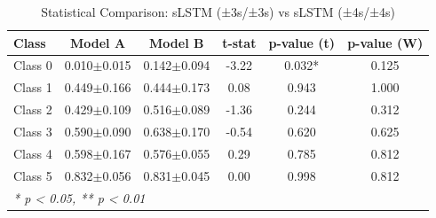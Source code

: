 \begin{table}[htbp]
\centering
\caption{Statistical Comparison: sLSTM (±3s/±3s) vs sLSTM (±4s/±4s)}
\label{tab:comparison_class_slstm_±3s_±3s_vs_slstm_±4s_±4s}
\begin{tabular}{lccccc}
\toprule
\textbf{Class} & \textbf{Model A} & \textbf{Model B} & \textbf{t-stat} & \textbf{p-value (t)} & \textbf{p-value (W)} \\
\midrule
Class 0 & 0.010$\pm$0.015 & 0.142$\pm$0.094 & -3.22 & 0.032* & 0.125 \\
Class 1 & 0.449$\pm$0.166 & 0.444$\pm$0.173 & 0.08 & 0.943 & 1.000 \\
Class 2 & 0.429$\pm$0.109 & 0.516$\pm$0.089 & -1.36 & 0.244 & 0.312 \\
Class 3 & 0.590$\pm$0.090 & 0.638$\pm$0.170 & -0.54 & 0.620 & 0.625 \\
Class 4 & 0.598$\pm$0.167 & 0.576$\pm$0.055 & 0.29 & 0.785 & 0.812 \\
Class 5 & 0.832$\pm$0.056 & 0.831$\pm$0.045 & 0.00 & 0.998 & 0.812 \\
\bottomrule
\multicolumn{6}{l}{\textit{* p < 0.05, ** p < 0.01}} \\
\end{tabular}
\end{table}